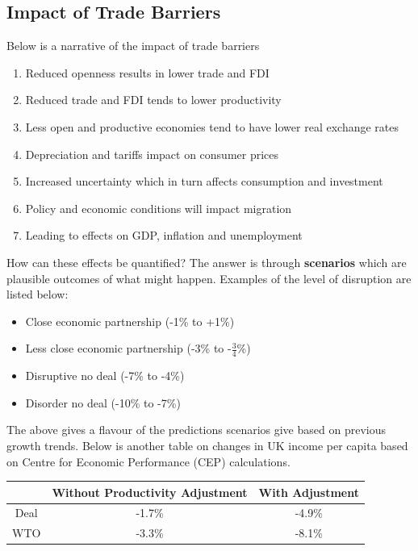 \documentclass[12pt, letterpaper]{article}
\begin{document}
\subsection{Impact of Trade Barriers}
Below is a narrative of the impact of trade barriers
\begin{enumerate}
	\item Reduced openness results in lower trade and FDI
	\item Reduced trade and FDI tends to lower productivity
	\item Less open and productive economies tend to have lower real exchange rates
	\item Depreciation and tariffs impact on consumer prices
	\item Increased uncertainty which in turn affects consumption and investment
	\item Policy and economic conditions will impact migration
	\item Leading to effects on GDP, inflation and unemployment
\end{enumerate}
How can these effects be quantified? The answer is through \textbf{scenarios} which are plausible outcomes of what might happen. Examples of the level of disruption are listed below:
\begin{itemize}
	\item Close economic partnership (-1\% to +1\%)
	\item Less close economic partnership (-3\% to -$\frac{3}{4}$\%)
	\item Disruptive no deal (-7\% to -4\%)
	\item Disorder no deal (-10\% to -7\%)
\end{itemize}
The above gives a flavour of the predictions scenarios give based on previous growth trends. Below is another table on changes in UK income per capita based on Centre for Economic Performance (CEP) calculations.
\begin{center}
	\begin{tabular}{|c|c|c|}
		\hline
		& Without Productivity Adjustment & With Adjustment\\
		\hline
		Deal & -1.7\% & -4.9\%\\
		\hline
		WTO & -3.3\% & -8.1\%\\
		\hline
	\end{tabular}
\end{center}
\end{document}
